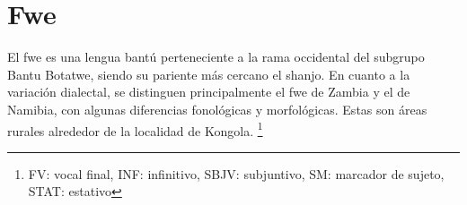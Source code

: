 \section*{Fwe}

\noindent El fwe es una lengua bantú perteneciente a la rama occidental del subgrupo Bantu Botatwe, siendo su pariente más cercano el shanjo. En cuanto a la variación dialectal, se distinguen principalmente el fwe de Zambia y el de Namibia, con algunas diferencias fonológicas y morfológicas. Estas son áreas rurales alrededor de la localidad de Kongola.
\footnote{FV: vocal final, INF: infinitivo, SBJV: subjuntivo, SM: marcador de sujeto, STAT: estativo}
\vspace{0.5cm}

